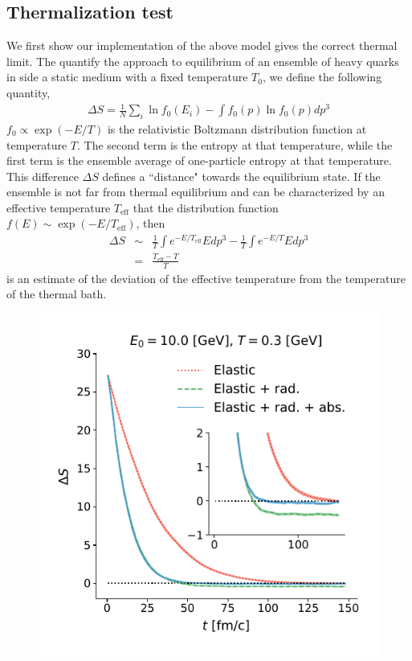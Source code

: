 \documentclass[aps, prc, reprint, amsmath, groupedaddress, nofootinbib]{revtex4-1}
\begin{document}
\subsection{Thermalization test}
We first show our implementation of the above model gives the correct thermal limit. 
The quantify the approach to equilibrium of an ensemble of heavy quarks in side a static medium with a fixed temperature $T_0$, we define the following quantity,
\begin{eqnarray}
\Delta S = \frac{1}{N}\sum_i \ln f_0(E_i) - \int f_0(p)\ln f_0(p) dp^3
\end{eqnarray}
$f_0 \propto \exp(-E/T)$ is the relativistic Boltzmann distribution function at temperature $T$. 
The second term is the entropy at that temperature, while the first term is the ensemble average of one-particle entropy at that temperature.
This difference $\Delta S$ defines a ``distance" towards the equilibrium state.
If the ensemble is not far from thermal equilibrium and can be characterized by an effective temperature $T_{\textrm{eff}}$ that the distribution function $f(E)\sim \exp(-E/T_{\textrm{eff}})$, then
\begin{eqnarray}
\nonumber
\Delta S &\sim& \frac{1}{T}\int  e^{-E/T_{\textrm{eff}}} E dp^3 - \frac{1}{T}\int e^{-E/T} E dp^3 \\
&=& \frac{T_\textrm{eff}-T}{T}
\end{eqnarray}
is an estimate of the deviation of the effective temperature from the temperature of the thermal bath.
\begin{figure}
\includegraphics[width=\columnwidth]{charm-plot/thermalization.pdf}
\end{figure}
\end{document}
